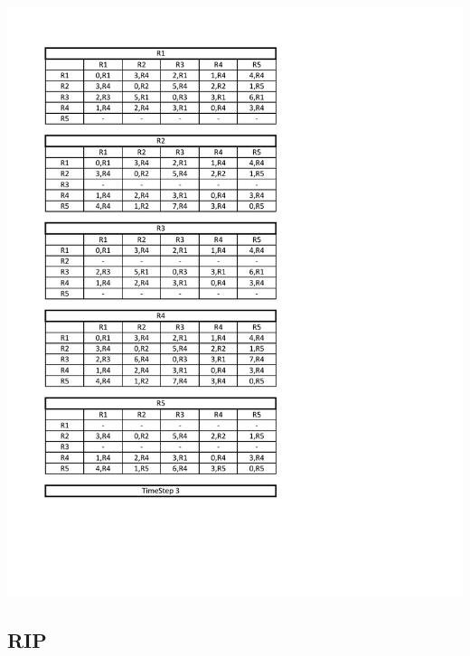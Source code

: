 \documentclass[12pt]{article}
\begin{document}
 \begin{center}
	\includegraphics[width = 1.0 \textwidth]{images/4.pdf}
\end{center}


\subsection{RIP}
\end{document}
